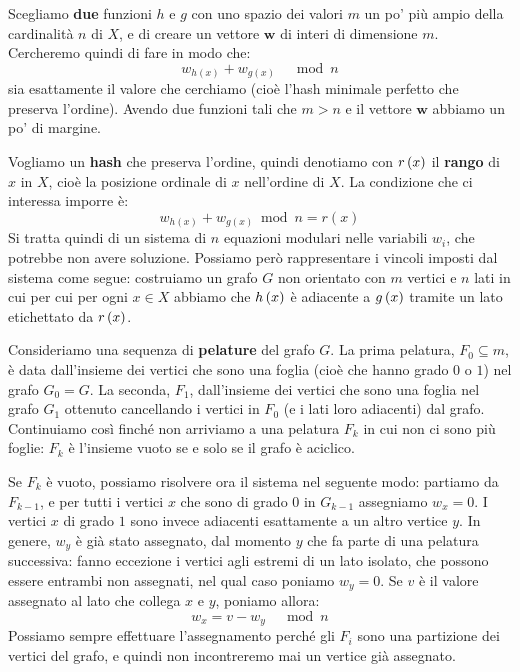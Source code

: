 \documentclass[\main/main.tex]{subfiles}
\begin{document}
\begin{analysis}
    Scegliamo \textbf{due} funzioni \(h\) e \(g\) con uno spazio dei valori \(m\) un po' più ampio della cardinalità \(n\) di \(X\), e di creare un vettore \(\bm{w}\) di interi di dimensione \(m\). Cercheremo quindi di fare in modo che:
    \[
        w_{h(x)}+w_{g(x)} \quad \bmod n
    \]
    sia esattamente il valore che cerchiamo (cioè l'hash minimale perfetto che preserva l'ordine). Avendo due funzioni tali che \(m>n\) e il vettore \(\bm{w}\) abbiamo un po' di margine.
    
    Vogliamo un \textbf{hash} che preserva l'ordine, quindi denotiamo con \(r\left(x\right)\) il \textbf{rango} di \(x\) in \(X\), cioè la posizione ordinale di \(x\) nell'ordine di \(X\). La condizione che ci interessa imporre è:
    \[
        w_{h(x)}+w_{g(x)} \bmod n=r(x)
    \]
    Si tratta quindi di un sistema di \(n\) equazioni modulari nelle variabili \(w_i\), che potrebbe non avere soluzione. Possiamo però rappresentare i vincoli imposti dal sistema come segue: costruiamo un grafo \(G\) non orientato con \(m\) vertici e \(n\) lati in cui per cui per ogni \(x \in X\) abbiamo che \(h\left(x\right)\) è adiacente a \(g\left(x\right)\) tramite un lato etichettato da \(r\left(x\right)\).
    
    Consideriamo una sequenza di \textbf{pelature} del grafo \(G\). La prima pelatura, \(F_0 \subseteq m\), è data dall'insieme dei vertici che sono una foglia (cioè che hanno grado \(0\) o \(1\)) nel grafo \(G_0 = G\). La seconda, \(F_1\), dall'insieme dei vertici che sono una foglia nel grafo \(G_1\) ottenuto cancellando i vertici in \(F_0\) (e i lati loro adiacenti) dal grafo. Continuiamo così finché non arriviamo a una pelatura \(F_k\) in cui non ci sono più foglie: \(F_k\) è l'insieme vuoto se e solo se il grafo è aciclico.
    
    Se \(F_k\) è vuoto, possiamo risolvere ora il sistema nel seguente modo: partiamo da \(F_{k-1}\), e per tutti i vertici \(x\) che sono di grado \(0\) in \(G_{k-1}\) assegniamo \(w_x = 0\). I vertici \(x\) di grado \(1\) sono invece adiacenti esattamente a un altro vertice \(y\). In genere, \(w_y\) è già stato assegnato, dal momento \(y\) che fa parte di una pelatura successiva: fanno eccezione i vertici agli estremi di un lato isolato, che possono essere entrambi non assegnati, nel qual caso poniamo \(w_y = 0\). Se \(v\) è il valore assegnato al lato che collega \(x\) e \(y\), poniamo allora:
    \[
        w_{x}=v-w_{y} \quad \bmod n
    \]
    Possiamo sempre effettuare l'assegnamento perché gli \(F_i\) sono una partizione dei vertici del grafo, e quindi non incontreremo mai un vertice già assegnato.
    

\end{analysis}
\end{document}
